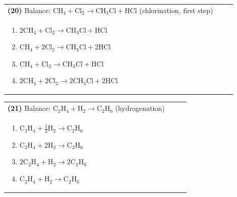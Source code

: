 \documentclass{article}
\begin{document}
{\vspace{0.2cm}
\noindent \begin{tabular}{|p{0.9\linewidth}|}
\hline
\vspace{0.2cm}
\textbf{(20)} Balance: \(\mathrm{CH_4 + Cl_2 \rightarrow CH_3Cl + HCl}\) (chlorination, first step)\\
\begin{minipage}[t]{0.85\linewidth}
\begin{enumerate}[label=\alph*.]
   \item \(\mathrm{2CH_4 + Cl_2 \rightarrow CH_3Cl + HCl}\)
   \item \(\mathrm{CH_4 + 2Cl_2 \rightarrow CH_3Cl + 2HCl}\)
   \item \(\mathrm{CH_4 + Cl_2 \rightarrow CH_3Cl + HCl}\)
   \item \(\mathrm{2CH_4 + 2Cl_2 \rightarrow 2CH_3Cl + 2HCl}\)
\end{enumerate}
\end{minipage}\\
\hline
\end{tabular}
\newpage

\vspace{0.2cm}
\noindent \begin{tabular}{|p{0.9\linewidth}|}
\hline
\vspace{0.2cm}
\textbf{(21)} Balance: \(\mathrm{C_2H_4 + H_2 \rightarrow C_2H_6}\) (hydrogenation)\\
\begin{minipage}[t]{0.85\linewidth}
\begin{enumerate}[label=\alph*.]
   \item \(\mathrm{C_2H_4 + \tfrac{1}{2}H_2 \rightarrow C_2H_6}\)
   \item \(\mathrm{C_2H_4 + 2H_2 \rightarrow C_2H_6}\)
   \item \(\mathrm{2C_2H_4 + H_2 \rightarrow 2C_2H_6}\)
   \item \(\mathrm{C_2H_4 + H_2 \rightarrow C_2H_6}\)
\end{enumerate}
\end{minipage}\\
\hline
\end{tabular}

}
\end{document}
